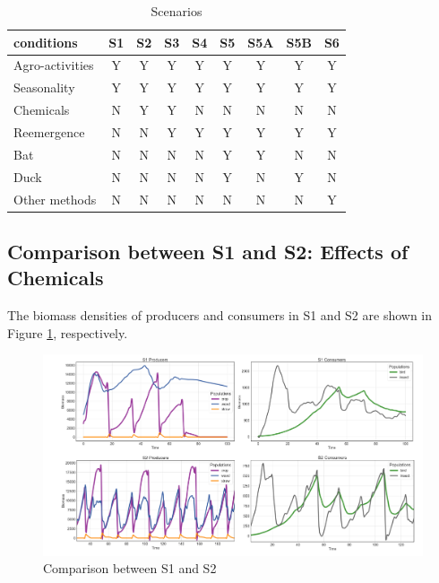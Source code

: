 \documentclass{HZNUMCM}
\begin{document}
        \begin{table}[H]
          \centering
          \caption{Scenarios}
          \begin{tabular}{lcccccccc}
            \toprule
            \rowcolor{customcolor!40} %
            conditions & S1 & S2 & S3 & S4 & S5 & S5A & S5B & S6 \\
            \midrule
            Agro-activities & Y & Y & Y & Y & Y & Y & Y & Y \\
            Seasonality & Y & Y & Y & Y & Y & Y & Y & Y \\
            Chemicals & N & Y & Y & N & N & N & N & N \\
            Reemergence & N & N & Y & Y & Y & Y & Y & Y \\
            Bat & N & N & N & N & Y & Y & N & N \\
            Duck & N & N & N & N & Y & N & Y & N \\
            Other methods & N & N & N & N & N & N & N & Y \\

            \bottomrule
          \end{tabular}
          \label{tab:Scenarios}
        \end{table}
      \subsection{Comparison between S1 and S2: Effects of Chemicals}

      The biomass densities of producers and consumers in S1 and S2 are shown in Figure \ref{fig:S1S2}, respectively.

      \begin{figure}
      \centering
      \includegraphics[width=\linewidth]{images/S1S2.png}
      \caption{Comparison between S1 and S2}
      \label{fig:S1S2}
      \end{figure}
      
\end{document}
